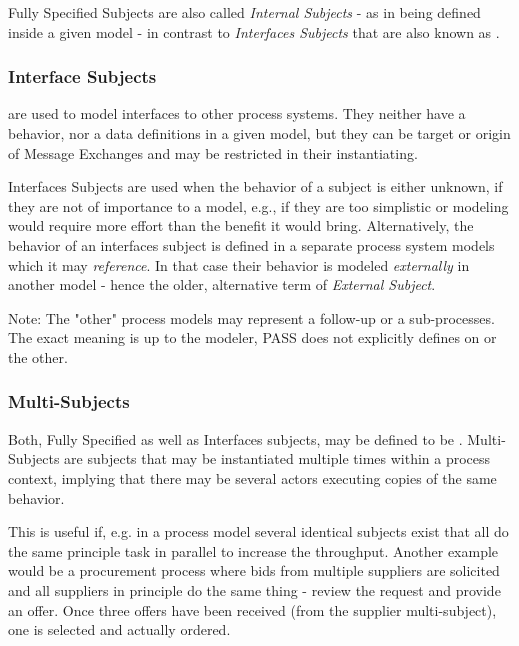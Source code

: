 Fully Specified Subjects are also called \textit{Internal Subjects} - as in being defined inside a given model - in contrast to \textit{Interfaces Subjects} that are also known as \textit{}.

\subsubsection{Interface Subjects}

 are used to model interfaces to other process systems. They neither have a behavior, nor a data definitions in a given model, but they can be target or origin of Message Exchanges and may be restricted in their instantiating.

Interfaces Subjects are used when the behavior of a subject is either unknown, if they are not of importance to a model, e.g., if they are too simplistic or modeling would require more effort than the benefit it would bring. Alternatively, the behavior of an interfaces subject is defined in a separate process system models which it may \textit{reference}. In that case their behavior is modeled \textit{externally} in another model - hence the older, alternative term of \textit{External Subject}.

Note: The "other" process models may represent a follow-up or a sub-processes. The exact meaning is up to the modeler, PASS does not explicitly defines on or the other.

\subsubsection{Multi-Subjects}
\label{sec:multiSubjects}

Both, Fully Specified as well as Interfaces subjects, may be defined to be . Multi-Subjects are subjects that may be instantiated multiple times within a process context, implying that there may be several actors executing copies of the same behavior.

This is useful if, e.g. in a process model several identical subjects exist that all do the same principle task in parallel to increase the throughput.  Another example would be a procurement process where bids from multiple suppliers are solicited and all suppliers in principle do the same thing - review the request and provide an offer. Once three offers have been received (from the supplier multi-subject), one is selected and actually ordered.

